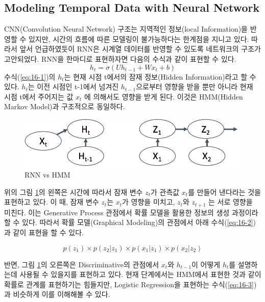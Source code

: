 \documentclass[draft=false]{oblivoir}
\begin{document}
\subsection{Modeling Temporal Data with Neural Network}
CNN(Convolution Neural Network) 구조는 지역적인 정보(local Information)을 반영할 수 있지만, 시간의 흐름에 따른 모델링이 불가능하다는 한계점을 지니고 있다. 따라서 앞서 언급하였듯이 RNN은 시계열 데이터를 반영할 수 있도록 네트워크의 구조가 고안되었다. RNN을 한마디로 표현하자면 다음의 수식과 같이 표현할 수 있다.
\begin{equation}
	h_t = \sigma (Uh_{t-1} + Wx_{t}+b)
\label{eq:16-1}
\end{equation}
수식(\ref{eq:16-1})의 $h_t$는 현재 시점 t에서의 잠재 정보(Hidden Information)라고 할 수 있다.  $h_t$는 이전 시점인 t-1에서 넘겨진 $h_{t-1}$으로부터 영향을 받을 뿐만 아니라 현재 시점 t에서 주어지는 값 $x_t$ 에 의해서도 영향을 받게 된다. 이것은 HMM(Hidden Markov Model)과 구조적으로 동일하다. 

\begin{figure}[ht] \centering 
  \includegraphics[scale=0.7]{fig5.png}
  \caption{RNN vs HMM}
\label{fig:16-5}
\end{figure}

위의 그림 \ref{fig:16-5}의 왼쪽은 시간에 따라서 잠재 변수 $z_t$가 관측값 $x_t$를 만들어 낸다라는 것을 표현하고 있다. 이 때, 잠재 변수 $z_t$는 $x_t$가 영향을 미치고, $z_{t}$와 $z_{t+1}$ 는 서로 영향을 미친다. 이는 Generative Process 관점에서 확률 모델을 활용한 정보의 생성 과정이라 할 수 있다. 따라서 확률 모델(Graphical Modeling)의 관점에서 아래 수식(\ref{eq:16-2})과 같이 표현을 할 수 있다.

\begin{equation}
	p(z_1) \times p(z_2|z_1) \times p(x_1|z_1) \times p(x_2|z_2)
\label{eq:16-2}
\end{equation}

반면, 그림 \ref{fig:16-5}의 오른쪽은 Discriminative의 관점에서 $x_t$와 $h_{t-1}$이 어떻게 $h_t$를 설명하는데 사용될 수 있을지를 표현하고 있다. 현재 단계에서는 HMM에서 표현한 것과 같이 확률로 관계를 표현하기는 힘들지만, Logistic Regression을 표현하는 수식(\ref{eq:16-3})과 비슷하게 이를 이해해볼 수 있다. 
\end{document}
